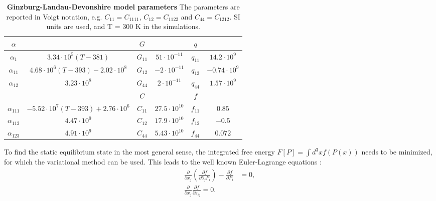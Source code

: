 \begin{table}
\begin{tabular}{|c|c|c|c|c|c|}
	\hline
	 $\alpha$ & & $G$ & & $q$ &\\
	 \hline
	 $\alpha_1$ & $3.34\cdot 10^5 (T - 381)$  & $G_{11}$ & $51 \cdot 10^{-11}$ & $q_{11}$ & $14.2 \cdot 10^{9}$ \\
	 $\alpha_{11}$ & $4.68 \cdot 10^6 (T-393) - 2.02 \cdot 10^8$ & $G_{12}$ & $-2 \cdot 10^{-11}$ & $q_{12}$ & $-0.74 \cdot 10^{9}$ \\
	 $\alpha_{12}$ & $3.23 \cdot 10^8$ & $G_{44}$ & $2 \cdot 10^{-11}$  & $q_{44}$ & $1.57 \cdot 10^{9}$ \\
	 \cline{3-6}
	 & & $C$ & & $f$ &\\
	 \cline{3-6}
	 $\alpha_{111}$ & $-5.52 \cdot 10^7 (T - 393) + 2.76 \cdot 10^6 $ & $C_{11}$ & $27.5 \cdot 10^{10}$ & $f_{11}$ & $0.85$ \\
	 $\alpha_{112}$ &  $4.47 \cdot 10^9 $ & $C_{12}$ & $17.9 \cdot 10^{10}$ & $f_{12}$ & $-0.5$  \\
	 $\alpha_{123}$ & $4.91 \cdot 10^9$ &$C_{44}$ & $5.43 \cdot 10^{10}$ & $f_{44}$ & $ 0.072$ \\
	 \hline
\end{tabular}
\caption{{\bf Ginzburg-Landau-Devonshire model parameters} The parameters are reported in Voigt notation, e.g. $C_{11} = C_{1111}$, $C_{12} = C_{1122}$ and $C_{44}= C_{1212}$.  SI units are used, and T = 300 K in the simulations.\label{tab:BTO_param}}
\end{table}

To find the static equilibrium state in the most general sense, the integrated free energy $F[P] = \int d^3x f(P(x))$ needs to be minimized, for which the variational method can be used.
This leads to the well known Euler-Lagrange equations \cite{Cao1991, Marton2010}:
\begin{align}
	\label{eq:BTO_euler}
	\frac{\partial}{\partial x_j}\left( \frac{\partial f}{\partial \partial_j P_i}\right) - \frac{\partial f}{\partial P_i} &= 0, \\
	\frac{\partial}{\partial x_j}\frac{\partial f}{\partial \varepsilon_{ij}} = 0.
\end{align}

